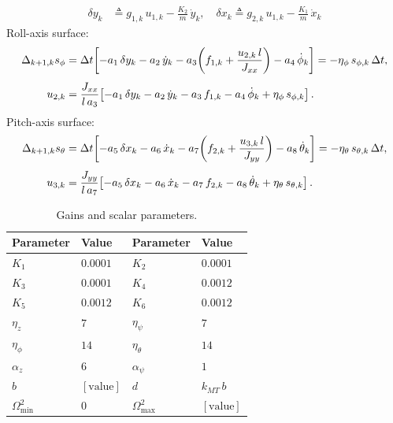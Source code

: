 \documentclass[conf]{new-aiaa}
\begin{document}
\begin{samepage}
\begin{align}
\end{align}
\begin{align}
\delta y_k &\triangleq g_{1,k}\,u_{1,k} - \frac{K_2}{m}\,\dot y_k, \quad
\delta x_k \triangleq g_{2,k}\,u_{1,k} - \frac{K_1}{m}\,\dot x_k
\end{align}
Roll-axis surface:
\begin{align}
\Delta_{k+1,k} s_{\phi}
&= \Delta t\!\left[ - a_1\,\delta y_k - a_2\,\dot y_k - a_3\!\left(f_{1,k} + \frac{u_{2,k}\,l}{J_{xx}}\right) - a_4\,\dot\phi_k \right]
= -\eta_\phi\,s_{\phi,k}\,\Delta t, \notag \\[4pt]
u_{2,k}
&= \frac{J_{xx}}{l\,a_3}\!\left[ - a_1\,\delta y_k - a_2\,\dot y_k - a_3\,f_{1,k} - a_4\,\dot\phi_k + \eta_\phi\,s_{\phi,k} \right].
\end{align}
Pitch-axis surface:
\begin{align}
\Delta_{k+1,k} s_{\theta}
&= \Delta t\!\left[ - a_5\,\delta x_k - a_6\,\dot x_k - a_7\!\left(f_{2,k} + \frac{u_{3,k}\,l}{J_{yy}}\right) - a_8\,\dot\theta_k \right]
= -\eta_\theta\,s_{\theta,k}\,\Delta t, \notag \\[4pt]
u_{3,k}
&= \frac{J_{yy}}{l\,a_7}\!\left[ - a_5\,\delta x_k - a_6\,\dot x_k - a_7\,f_{2,k} - a_8\,\dot\theta_k + \eta_\theta\,s_{\theta,k} \right].
\end{align}
\endgroup
\end{samepage}

\begingroup
\footnotesize
\setlength{\tabcolsep}{4pt}
\begin{table}[t]
\vspace*{25pt}
\centering
\caption{Gains and scalar parameters.}
\label{tab:gains-scalars}
\begin{tabular}{ll@{\hskip 18pt}ll}
\toprule
Parameter & Value & Parameter & Value \\
\midrule
$K_1$ & $0.0001$ & $K_2$ & $0.0001$ \\
$K_3$ & $0.0001$ & $K_4$ & $0.0012$ \\
$K_5$ & $0.0012$ & $K_6$ & $0.0012$ \\
$\eta_z$ & $7$ & $\eta_\psi$ & $7$ \\
$\eta_\phi$ & $14$ & $\eta_\theta$ & $14$ \\
$\alpha_z$ & $6$ & $\alpha_\psi$ & $1$ \\
$b$ & $[\text{value}]$ & $d$ & $k_{MT}\, b$ \\
$\Omega^2_{\min}$ & $0$ & $\Omega^2_{\max}$ & $[\text{value}]$ \\
\bottomrule
\end{tabular}
\end{table}
\endgroup
\end{document}
